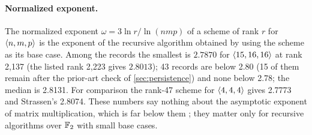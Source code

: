 \paragraph{Normalized exponent.}
The normalized exponent $\omega=3\ln r/\ln(nmp)$ of a scheme of rank $r$ for $\langle n,m,p\rangle$ is the exponent of the recursive algorithm obtained by using the scheme as its base case.
Among the records the smallest is $2.7870$ for $\langle 15,16,16\rangle$ at rank 2{,}137 (the listed rank 2{,}223 gives $2.8013$); 43 records are below 2.80 (15 of them remain after the prior-art check of \cref{sec:persistence}) and none below 2.78; the median is 2.8131. For comparison the rank-47 scheme for $\langle 4,4,4\rangle$ gives 2.7773 and Strassen's 2.8074.
These numbers say nothing about the asymptotic exponent of matrix multiplication, which is far below them \cite{alman2025asymmetry,dupont2026omega}; they matter only for recursive algorithms over ${\mathbb{F}_2}$ with small base cases.
